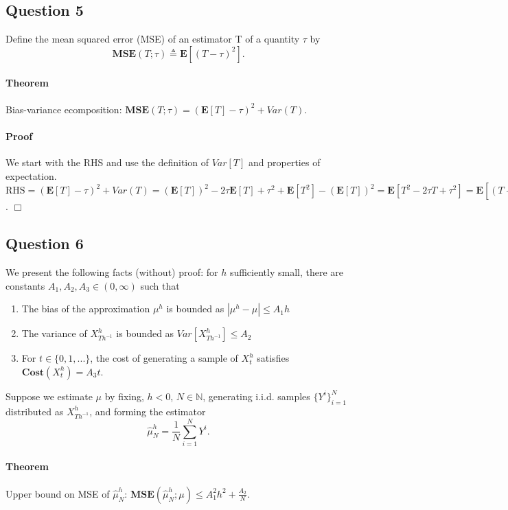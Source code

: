 \documentclass{article}
\begin{document}
\subsection{Question 5}
Define the mean squared error (MSE) of an estimator T of a quantity $\tau$ by
\begin{equation}
\textbf{MSE}(T;\tau) \triangleq \textbf{E}[(T-\tau)^2].
\end{equation}
\paragraph{Theorem} Bias-variance ecomposition: $\textbf{MSE}(T;\tau)=(\textbf{E}[T]-\tau)^2+Var(T)$.
\paragraph{Proof} We start with the RHS and use the definition of $Var[T]$ and properties of expectation. $\text{RHS}=(\textbf{E}[T]-\tau)^2+Var(T)=(\textbf{E}[T])^2-2 \tau \textbf{E}[T]+\tau^2+ \textbf{E}[T^2]-(\textbf{E}[T])^2=\textbf{E}[T^2-2 \tau T+\tau^2]=\textbf{E}[(T- \tau )^2]=\textbf{MSE}(T;\tau)=\text{LHS}$. \indent{} $\Box$

\subsection{Question 6}
We present the following facts (without) proof: for $h$ sufficiently small, there are constants $A_1, A_2, A_3 \in (0, \infty)$ such that
\begin{enumerate}
\item The bias of the approximation $\mu^h$ is bounded as $|\mu^h-\mu| \leq A_1 h$
\item The variance of $X_{Th^{-1}}^h$ is bounded as $Var[X_{Th^{-1}}^h] \leq A_2$
\item For $t\in \{0,1,...\}$, the cost of generating a sample of $X_t^h$ satisfies $\textbf{Cost}(X_t^h)=A_3t$.
\end{enumerate}
Suppose we estimate $\mu$ by fixing, $h<0$, $N \in \mathbb{N}$, generating i.i.d. samples $\{Y^i\}_{i=1}^N$ distributed as $X_{Th^{-1}}^h$, and forming the estimator
\begin{equation}
\hat{\mu}_N^h= \frac{1}{N} \sum_{i=1}^N Y^i.
\end{equation}
\paragraph{Theorem} Upper bound on MSE of $\hat{\mu}_N^h$: $\textbf{MSE}(\hat{\mu}_N^h;\mu) \leq A_1^2 h^2 + \frac{A_2}{N}.$
\end{document}
